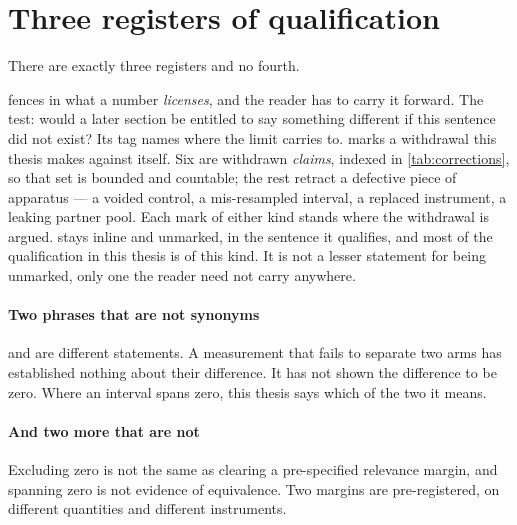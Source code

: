 \section*{Three registers of qualification}

\noindent
There are exactly three registers and no fourth.

\begin{description}[leftmargin=1em, itemsep=0.5ex,
                    font=\normalfont\bfseries]
 fences in what a number \emph{licenses}, and
  the reader has to carry it forward. The test: would a later section be
  entitled to say something different if this sentence did not exist? Its tag
  names where the limit carries to.
 marks a withdrawal this thesis makes against
  itself. Six are withdrawn \emph{claims}, indexed in \cref{tab:corrections}, so
  that set is bounded and countable; the rest retract a defective piece of
  apparatus --- a voided control, a mis-resampled interval, a replaced
  instrument, a leaking partner pool. Each mark of either kind stands where the
  withdrawal is argued.
 stays inline and unmarked, in the
  sentence it qualifies, and most of the qualification in this thesis is of this
  kind. It is not a lesser statement for being unmarked, only one the reader
  need not carry anywhere.
\end{description}

\paragraph{Two phrases that are not synonyms} \notestablished and \shownzero
are different statements.
A measurement that fails to separate two arms has established nothing about
their difference. It has not shown the difference to be zero. Where an interval
spans zero, this thesis says which of the two it means.

\paragraph{And two more that are not} Excluding zero is not the same as clearing a
pre-spec\-i\-fied relevance margin, and spanning zero is not evidence of
equivalence. Two margins are pre-registered, on different quantities and
different instruments.

